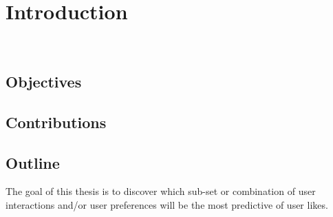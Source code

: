 
\chapter{Introduction}
\label{cha:intro}

~\cite{goossens94}

\section{Objectives}
\label{sec:objectives}

\section{Contributions}
\label{sec:contributions}

\section{Outline}
\label{sec:outline}

The goal of this thesis is to discover which sub-set or combination of user interactions and/or user preferences will be the most predictive of user likes. 



